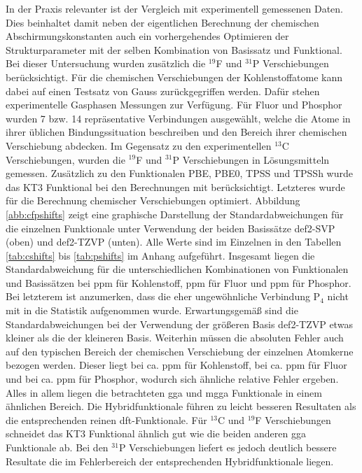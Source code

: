 \bigskip
In der Praxis relevanter ist der Vergleich mit experimentell gemessenen Daten. Dies beinhaltet damit neben der eigentlichen Berechnung der chemischen Abschirmungskonstanten auch ein vorhergehendes Optimieren der Strukturparameter mit der selben Kombination von Basissatz und Funktional. Bei dieser Untersuchung wurden zusätzlich die $^{19}$F und $^{31}$P Verschiebungen berücksichtigt. Für die chemischen Verschiebungen der Kohlenstoffatome kann dabei auf einen Testsatz von Gauss\supercite{gauss1993effects} zurückgegriffen werden. Dafür stehen experimentelle Gasphasen Messungen zur Verfügung.\supercite{jameson1987gas} Für Fluor und Phosphor wurden 7 bzw. 14 repräsentative Verbindungen ausgewählt, welche die Atome in ihrer üblichen Bindungssituation beschreiben und den Bereich ihrer chemischen Verschiebung abdecken. Im Gegensatz zu den experimentellen $^{13}$C Verschiebungen, wurden die $^{19}$F und $^{31}$P Verschiebungen in Lösungsmitteln gemessen. Zusätzlich zu den Funktionalen PBE, PBE0, TPSS und TPSSh wurde das KT3\supercite{keal2004semiempirical} Funktional bei den Berechnungen mit berücksichtigt. Letzteres wurde für die Berechnung chemischer Verschiebungen optimiert. Abbildung \ref{abb:cfpshifts} zeigt eine graphische Darstellung der Standardabweichungen für die einzelnen Funktionale unter Verwendung der beiden Basissätze def2-SVP (oben) und def2-TZVP (unten). Alle Werte sind im Einzelnen in den Tabellen \ref{tab:cshifts} bis \ref{tab:pshifts} im Anhang aufgeführt. Insgesamt liegen die Standardabweichung für die unterschiedlichen Kombinationen von Funktionalen und Basissätzen bei \unit[3-8]{ppm} für Kohlenstoff, \unit[5-20]{ppm} für Fluor und \unit[17-34]{ppm} für Phosphor. Bei letzterem ist anzumerken, dass die eher ungewöhnliche Verbindung P$_4$ nicht mit in die Statistik aufgenommen wurde. Erwartungsgemäß sind die Standardabweichungen bei der Verwendung der größeren Basis def2-TZVP etwas kleiner als die der kleineren Basis. Weiterhin müssen die absoluten Fehler auch auf den typischen Bereich der chemischen Verschiebung der einzelnen Atomkerne bezogen werden. Dieser liegt bei ca. \unit[200]{ppm} für Kohlenstoff, bei ca. \unit[300]{ppm} für Fluor und bei ca. \unit[500]{ppm} für Phosphor, wodurch sich ähnliche relative Fehler ergeben. Alles in allem liegen die betrachteten \ac{gga} und \ac{mgga} Funktionale in einem ähnlichen Bereich. Die Hybridfunktionale führen zu leicht besseren Resultaten als die entsprechenden reinen \ac{dft}-Funktionale. Für $^{13}$C und $^{19}$F Verschiebungen schneidet das KT3 Funktional ähnlich gut wie die beiden anderen \ac{gga} Funktionale ab. Bei den $^{31}$P Verschiebungen liefert es jedoch deutlich bessere Resultate die im Fehlerbereich der entsprechenden Hybridfunktionale liegen. 

